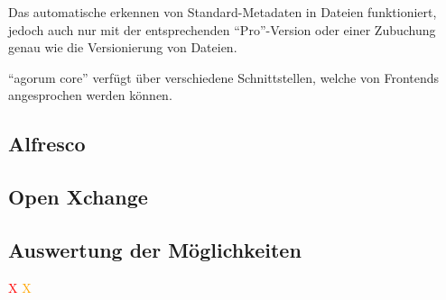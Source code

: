 Das automatische erkennen von Standard-Metadaten in Dateien funktioniert, jedoch auch nur mit der entsprechenden "`Pro"'-Version oder einer Zubuchung genau wie die Versionierung von Dateien.

"`agorum core"' verf\"ugt \"uber verschiedene Schnittstellen, welche von Frontends angesprochen werden k\"onnen. 

\subsection{Alfresco}
\subsection{Open Xchange}
\subsection{Auswertung der M\"oglichkeiten}\label{Auswertung ECM}
\textcolor{green}{\checkmark} \textcolor{red}{X} \textcolor{orange}{\checkmark X}